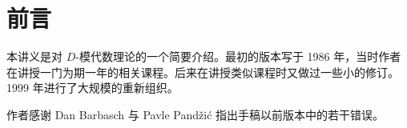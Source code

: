 \chapter*{前言}

本讲义是对 $D$-模代数理论的一个简要介绍。最初的版本写于 1986 年，当时作者在讲授一门为期一年的相关课程。后来在讲授类似课程时又做过一些小的修订。1999 年进行了大规模的重新组织。

作者感谢 Dan Barbasch 与 Pavle Pandžić 指出手稿以前版本中的若干错误。

